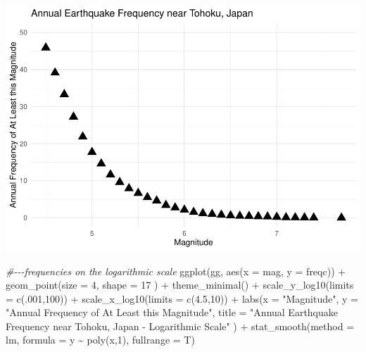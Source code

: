 \documentclass[
]{article}
\newenvironment{Shaded}{\begin{snugshade}}{\end{snugshade}}
\newcommand{\AttributeTok}[1]{\textcolor[rgb]{0.77,0.63,0.00}{#1}}
\newcommand{\CommentTok}[1]{\textcolor[rgb]{0.56,0.35,0.01}{\textit{#1}}}
\newcommand{\DecValTok}[1]{\textcolor[rgb]{0.00,0.00,0.81}{#1}}
\newcommand{\FloatTok}[1]{\textcolor[rgb]{0.00,0.00,0.81}{#1}}
\newcommand{\FunctionTok}[1]{\textcolor[rgb]{0.00,0.00,0.00}{#1}}
\newcommand{\NormalTok}[1]{#1}
\newcommand{\SpecialCharTok}[1]{\textcolor[rgb]{0.00,0.00,0.00}{#1}}
\newcommand{\StringTok}[1]{\textcolor[rgb]{0.31,0.60,0.02}{#1}}
\begin{document}
\includegraphics{earthquakes_files/figure-latex/unnamed-chunk-4-1.pdf}

\begin{Shaded}
\begin{Highlighting}[]
\CommentTok{\#{-}{-}{-}frequencies on the logarithmic scale}
\FunctionTok{ggplot}\NormalTok{(gg, }\FunctionTok{aes}\NormalTok{(}\AttributeTok{x =}\NormalTok{ mag, }\AttributeTok{y =}\NormalTok{ freqc)) }\SpecialCharTok{+}
  \FunctionTok{geom\_point}\NormalTok{(}\AttributeTok{size =} \DecValTok{4}\NormalTok{, }\AttributeTok{shape =} \DecValTok{17}\NormalTok{ ) }\SpecialCharTok{+}
  \FunctionTok{theme\_minimal}\NormalTok{() }\SpecialCharTok{+}
  \FunctionTok{scale\_y\_log10}\NormalTok{(}\AttributeTok{limits =} \FunctionTok{c}\NormalTok{(.}\DecValTok{001}\NormalTok{,}\DecValTok{100}\NormalTok{)) }\SpecialCharTok{+}
  \FunctionTok{scale\_x\_log10}\NormalTok{(}\AttributeTok{limits =} \FunctionTok{c}\NormalTok{(}\FloatTok{4.5}\NormalTok{,}\DecValTok{10}\NormalTok{)) }\SpecialCharTok{+}
  \FunctionTok{labs}\NormalTok{(}\AttributeTok{x =} \StringTok{"Magnitude"}\NormalTok{,}
       \AttributeTok{y =} \StringTok{"Annual Frequency of At Least this Magnitude"}\NormalTok{,}
       \AttributeTok{title =} \StringTok{"Annual Earthquake Frequency near Tohoku, Japan {-} Logarithmic Scale"}\NormalTok{ ) }\SpecialCharTok{+}
  \FunctionTok{stat\_smooth}\NormalTok{(}\AttributeTok{method =}\NormalTok{ lm,}
              \AttributeTok{formula =}\NormalTok{ y }\SpecialCharTok{\textasciitilde{}} \FunctionTok{poly}\NormalTok{(x,}\DecValTok{1}\NormalTok{),}
              \AttributeTok{fullrange =}\NormalTok{ T)}
\end{Highlighting}
\end{Shaded}
\end{document}
